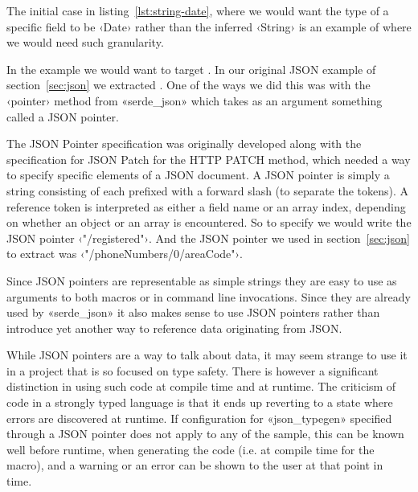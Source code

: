 The initial case in listing~\ref{lst:string-date}, where we would want the type of a specific field to be ‹Date› rather than the inferred ‹String› is an example of where we would need such granularity.

In the example we would want to target . In our original JSON example of section~\ref{sec:json} we extracted . One of the ways we did this was with the ‹pointer› method from «serde_json» which takes as an argument something called a JSON pointer.

The JSON Pointer specification\cite{RFC6901} was originally developed along with the specification for JSON Patch\cite{RFC6902} for the HTTP PATCH method, which needed a way to specify specific elements of a JSON document. A JSON pointer is simply a string consisting of  each prefixed with a forward slash (to separate the tokens). A reference token is interpreted as either a field name or an array index, depending on whether an object or an array is encountered. So to specify  we would write the JSON pointer ‹"/registered"›. And the JSON pointer we used in section~\ref{sec:json} to extract  was ‹"/phoneNumbers/0/areaCode"›.

Since JSON pointers are representable as simple strings they are easy to use as arguments to both macros or in command line invocations. Since they are already used by «serde_json» it also makes sense to use JSON pointers rather than introduce yet another way to reference data originating from JSON.

While JSON pointers are a  way to talk about data, it may seem strange to use it in a project that is so focused on type safety. There is however a significant distinction in using such code at compile time and at runtime. The criticism of  code in a strongly typed language is that it ends up reverting to a state where errors are discovered at runtime. If configuration for «json_typegen» specified through a JSON pointer does not apply to any of the sample, this can be known well before runtime, when generating the code (i.e. at compile time for the macro), and a warning or an error can be shown to the user at that point in time.


